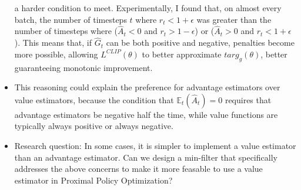 \documentclass[a4paper]{article}
\begin{document}
\begin{itemize}
        a harder condition to meet. Experimentally, I found that, on almost
        every batch, the number of timesteps $t$ where
        $r_t < 1 + \epsilon$ was greater than the number of timesteps where
        ($\hat{A}_t < 0$ and $r_t > 1 - \epsilon$) or ($\hat{A}_t > 0$ and 
        $r_t < 1 + \epsilon$). This means that, if $\hat{G}_t$ can be
        both positive and negative, penalties become more possible, allowing
        $L^{CLIP}(\theta)$ to better approximate $targ_{g}(\theta)$, better
        guaranteeing monotonic improvement.
    \item This reasoning could explain the preference for
        advantage estimators over value estimators, because the condition that 
        $\mathbb{E}_t(\hat{A}_t) = 0$ requires that advantage estimators be
        negative half the time, while value functions are typically always
        positive or always negative.
    \item Research question: In some cases, it is simpler to implement a value
        estimator than an advantage estimator. Can we design a min-filter that
        specifically addresses the above concerns to make it more feasable to
        use a value estimator in Proximal Policy Optimization?
        
\end{itemize}
\newpage
\end{document}

